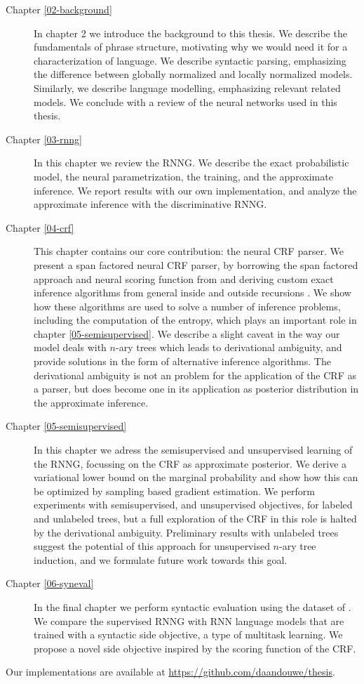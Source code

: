 \begin{description}
  \item[Chapter \ref{02-background}]
    In chapter 2 we introduce the background to this thesis. We describe the fundamentals of phrase structure, motivating why we would need it for a characterization of language. We describe syntactic parsing, emphasizing the difference between globally normalized and locally normalized models. Similarly, we describe language modelling, emphasizing relevant related models. We conclude with a review of the neural networks used in this thesis.

  \item[Chapter \ref{03-rnng}]
    In this chapter we review the RNNG. We describe the exact probabilistic model, the neural parametrization, the training, and the approximate inference. We report results with our own implementation, and analyze the approximate inference with the discriminative RNNG.

  \item[Chapter \ref{04-crf}]
    This chapter contains our core contribution: the neural CRF parser. We present a span factored neural CRF parser, by borrowing the span factored approach and neural scoring function from \citet{stern2017minimal} and deriving custom exact inference algorithms from general inside and outside recursions \citep{goodman1999semiring}. We show how these algorithms are used to solve a number of inference problems, including the computation of the entropy, which plays an important role in chapter \ref{05-semisupervised}. We describe a slight caveat in the way our model deals with $n$-ary trees which leads to derivational ambiguity, and provide solutions in the form of alternative inference algorithms. The derivational ambiguity is not an problem for the application of the CRF as a parser, but does become one in its application as posterior distribution in the approximate inference.

  \item[Chapter \ref{05-semisupervised}]
    In this chapter we adress the semisupervised and unsupervised learning of the RNNG, focussing on the CRF as approximate posterior. We derive a variational lower bound on the marginal probability and show how this can be optimized by sampling based gradient estimation. We perform experiments with semisupervised, and unsupervised objectives, for labeled and unlabeled trees, but a full exploration of the CRF in this role is halted by the derivational ambiguity. Preliminary results with unlabeled trees suggest the potential of this approach for unsupervised $n$-ary tree induction, and we formulate future work towards this goal.


  \item[Chapter \ref{06-syneval}]
    In the final chapter we perform syntactic evaluation using the dataset of \citet{linzen2018targeted}. We compare the supervised RNNG with RNN language models that are trained with a syntactic side objective, a type of multitask learning. We propose a novel side objective inspired by the scoring function of the CRF.

\end{description}


Our implementations are available at \url{https://github.com/daandouwe/thesis}.

